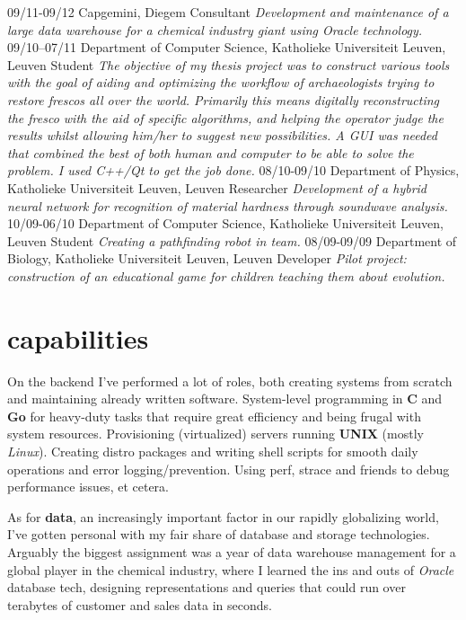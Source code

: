 \documentclass[]{friggeri-cv}
\begin{document}
\begin{entrylist}
  \entry
    {09/11-09/12}
    {Capgemini, Diegem}
    {Consultant}
    {\emph{Development and maintenance of a large data warehouse for a chemical industry giant using Oracle technology.}}
  \entry
    {09/10--07/11}
    {Department of Computer Science, Katholieke Universiteit Leuven, Leuven}
    {Student}
    {\emph{The objective of my thesis project was to construct various tools with the goal of aiding and optimizing the workflow of archaeologists trying to restore frescos all over the world. Primarily this means digitally reconstructing the fresco with the aid of specific algorithms, and helping the operator judge the results whilst allowing him/her to suggest new possibilities. A GUI was needed that combined the best of both human and computer to be able to solve the problem. I used C++/Qt to get the job done.}}
  \entry
    {08/10-09/10}
    {Department of Physics, Katholieke Universiteit Leuven, Leuven}
    {Researcher}
    {\emph{Development of a hybrid neural network for recognition of material hardness through soundwave analysis.}}
  \entry
    {10/09-06/10}
    {Department of Computer Science, Katholieke Universiteit Leuven, Leuven}
    {Student}
    {\emph{Creating a pathfinding robot in team.}}
  \entry
    {08/09-09/09}
    {Department of Biology, Katholieke Universiteit Leuven, Leuven}
    {Developer}
    {\emph{Pilot project: construction of an educational game for children teaching them about evolution.}}
\end{entrylist}

\section{capabilities}

On the backend I've performed a lot of roles, both creating systems from scratch and maintaining already written software. System-level programming in \textbf{C} and \textbf{Go} for heavy-duty tasks that require great efficiency and being frugal with system resources. Provisioning (virtualized) servers running \textbf{UNIX} (mostly \emph{Linux}). Creating distro packages and writing shell scripts for smooth daily operations and error logging/prevention. Using perf, strace and friends to debug performance issues, et cetera.

As for \textbf{data}, an increasingly important factor in our rapidly globalizing world, I've gotten personal with my fair share of database and storage technologies. Arguably the biggest assignment was a year of data warehouse management for a global player in the chemical industry, where I learned the ins and outs of \emph{Oracle} database tech, designing representations and queries that could run over terabytes of customer and sales data in seconds.
\end{document}
